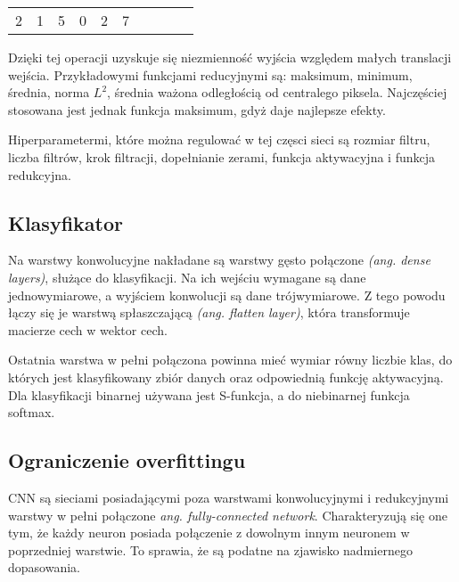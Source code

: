 \begin{table}[h]
\begin{tabular}{llllllllll}
\multicolumn{1}{|l|}{\cellcolor[HTML]{FFCB2F}2} & \multicolumn{1}{l|}{\cellcolor[HTML]{FFCB2F}1}  & \multicolumn{1}{l|}{\cellcolor[HTML]{FFCB2F}5} & \multicolumn{1}{l|}{\cellcolor[HTML]{32CB00}0} & \multicolumn{1}{l|}{\cellcolor[HTML]{32CB00}2} & \multicolumn{1}{l|}{\cellcolor[HTML]{32CB00}7} &  &                       &                                                 &                                                \\ \cline{1-6}
\end{tabular}
\end{table}

Dzięki tej operacji uzyskuje się niezmienność wyjścia względem małych translacji wejścia. Przykładowymi funkcjami reducyjnymi są: maksimum, minimum, średnia, norma \begin{math}L^{2}\end{math}, średnia ważona odległością od centralego piksela. Najczęściej stosowana jest jednak funkcja maksimum, gdyż daje najlepsze efekty. \cite{pooling}

Hiperparametermi, które można regulować w tej częsci sieci są rozmiar filtru, liczba filtrów, krok filtracji, dopełnianie zerami, funkcja aktywacyjna i funkcja redukcyjna.

\subsection{Klasyfikator}
Na warstwy konwolucyjne nakładane są warstwy gęsto połączone \textit{(ang. dense layers)}, służące do klasyfikacji. Na  ich wejściu wymagane są dane jednowymiarowe, a wyjściem konwolucji są dane trójwymiarowe. Z tego powodu łączy się je warstwą spłaszczającą \textit{(ang. flatten layer)}, która transformuje macierze cech w wektor cech.

Ostatnia warstwa w pełni połączona powinna mieć wymiar równy liczbie klas, do których jest klasyfikowany zbiór danych oraz odpowiednią funkcję aktywacyjną. Dla klasyfikacji binarnej używana jest S-funkcja, a do niebinarnej funkcja softmax.

\subsection{Ograniczenie overfittingu}
CNN są sieciami posiadającymi poza warstwami konwolucyjnymi i redukcyjnymi warstwy w pełni połączone \textit{ang. fully-connected network}. Charakteryzują się one tym, że każdy neuron posiada połączenie z dowolnym innym neuronem w poprzedniej warstwie. To sprawia, że są podatne na zjawisko nadmiernego dopasowania. 

